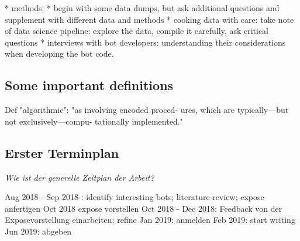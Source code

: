 \documentclass[pdftex,a4paper,11pt]{scrartcl}
\begin{document}
* methods:
  * begin with some data dumps, but ask additional questions and supplement with different data and methods
  * cooking data with care: take note of data science pipeline: explore the data, compile it carefully, ask critical questions
  * interviews with bot developers: understanding their considerations when developing the bot code.

\subsection{Some important definitions}
Def "algorithmic": "as involving encoded proced-
ures, which are typically—but not exclusively—compu-
tationally implemented."~\cite{Geiger2017}

\subsection{Erster Terminplan}
\noindent  \emph{Wie ist der generelle Zeitplan der Arbeit? }

Aug 2018 - Sep 2018 : identify interesting bots; literature review; expose anfertigen
Oct 2018 expose vorstellen
Oct 2018 - Dec 2018: Feedback von der Exposevorstellung einarbeiten; refine
Jan 2019: anmelden
Feb 2019: start writing
Jun 2019: abgeben

\begin{comment}
\begin{itemize}
	\item Sie sollten bereits wissen, wann Sie fertig sein wollen und von dort mit der Rückwärtsterminierung starten.
	\item Ihre Arbeit ist ein Projekt, daher planen Sie es auch wie eines. Nutzen Sie zur Visualisierung ein Gantt-Chart.
\end{itemize}
\end{comment}

{}   %


\begin{comment}
\newpage
\section*{Anhang I: Auszug Prüfungsordnung Master}
\label{sec:master}

\begin{figure}[!h]
	\centering
		\texttt{[image: pics/Auszug\_Master\_Pruefungsordnung.pdf]}
	\caption{Auszug Prüfungsordnung Master}
\end{figure}
\end{comment}
\end{document}
